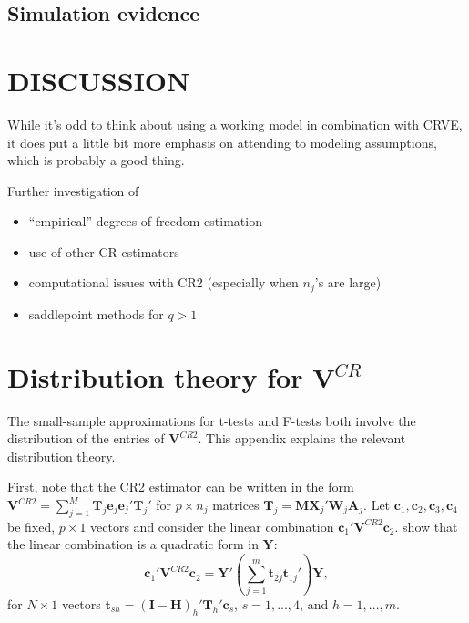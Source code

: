 \documentclass[12pt]{article}\usepackage[]{graphicx}\usepackage[]{color}
\newcommand{\bm}{\mathbf}
\begin{document}
\subsection{Simulation evidence}
\label{subsec:simulation_F}

\section{DISCUSSION}
\label{sec:discussion}

While it's odd to think about using a working model in combination with CRVE, it does put a little bit more emphasis on attending to modeling assumptions, which is probably a good thing. 

Further investigation of
\begin{itemize}
\item ``empirical'' degrees of freedom estimation
\item use of other CR estimators
\item computational issues with CR2 (especially when $n_j$'s are large)
\item saddlepoint methods for $q > 1$
\end{itemize}

\appendix

\section{Distribution theory for $\bm{V}^{CR}$}
\label{app:VCR_dist}

The small-sample approximations for t-tests and F-tests both involve the distribution of the entries of $\bm{V}^{CR2}$. This appendix explains the relevant distribution theory.

First, note that the CR2 estimator can be written in the form $\bm{V}^{CR2} = \sum_{j=1}^M \bm{T}_j \bm{e}_j \bm{e}_j' \bm{T}_j'$ for $p \times n_j$ matrices $\bm{T}_j = \bm{M} \bm{X}_j' \bm{W}_j \bm{A}_j$.
Let $\bm{c}_1,\bm{c}_2,\bm{c}_3,\bm{c}_4$ be fixed, $p \times 1$ vectors and consider the linear combination $\bm{c}_1' \bm{V}^{CR2} \bm{c}_2$. 
\citet[Theorem 4]{Bell2002bias} show that the linear combination is a quadratic form in $\bm{Y}$: \[
\bm{c}_1' \bm{V}^{CR2} \bm{c}_2 = \bm{Y}'\left(\sum_{j=1}^m \bm{t}_{2j} \bm{t}_{1j}'\right) \bm{Y}, \]
for $N \times 1$ vectors $\bm{t}_{sh} = \left(\bm{I} - \bm{H}\right)_h' \bm{T}_h' \bm{c}_s$, $s = 1,...,4$, and $h = 1,...,m$. 
\end{document}
